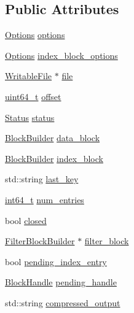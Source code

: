 \subsection*{Public Attributes}
\begin{DoxyCompactItemize}
\item 
\hyperlink{structleveldb_1_1_options}{Options} \hyperlink{structleveldb_1_1_table_builder_1_1_rep_a0ca1914136ea4c451b026b4f1913fe36}{options}
\item 
\hyperlink{structleveldb_1_1_options}{Options} \hyperlink{structleveldb_1_1_table_builder_1_1_rep_a3ae22fe880ca1b98c3a7e24c1ec72c98}{index\+\_\+block\+\_\+options}
\item 
\hyperlink{classleveldb_1_1_writable_file}{Writable\+File} $\ast$ \hyperlink{structleveldb_1_1_table_builder_1_1_rep_a3c33014db181b382785784cf0864f92b}{file}
\item 
\hyperlink{stdint_8h_aaa5d1cd013383c889537491c3cfd9aad}{uint64\+\_\+t} \hyperlink{structleveldb_1_1_table_builder_1_1_rep_a308abc45d45b23d05a0764f6fc501c40}{offset}
\item 
\hyperlink{classleveldb_1_1_status}{Status} \hyperlink{structleveldb_1_1_table_builder_1_1_rep_a8345f0a97587121457fb180a1fb081dd}{status}
\item 
\hyperlink{classleveldb_1_1_block_builder}{Block\+Builder} \hyperlink{structleveldb_1_1_table_builder_1_1_rep_a6bef8b1271d88ec2d38aa7a0f9ae8a24}{data\+\_\+block}
\item 
\hyperlink{classleveldb_1_1_block_builder}{Block\+Builder} \hyperlink{structleveldb_1_1_table_builder_1_1_rep_a7d5740122ca84239cb009d513cf14681}{index\+\_\+block}
\item 
std\+::string \hyperlink{structleveldb_1_1_table_builder_1_1_rep_a5a071831c7e42011a40b04cb60cdfa09}{last\+\_\+key}
\item 
\hyperlink{stdint_8h_adec1df1b8b51cb32b77e5b86fff46471}{int64\+\_\+t} \hyperlink{structleveldb_1_1_table_builder_1_1_rep_a89f93baffb3ca5c8239796dc1a57777a}{num\+\_\+entries}
\item 
bool \hyperlink{structleveldb_1_1_table_builder_1_1_rep_a5324550d58b999bcea173b1c21060138}{closed}
\item 
\hyperlink{classleveldb_1_1_filter_block_builder}{Filter\+Block\+Builder} $\ast$ \hyperlink{structleveldb_1_1_table_builder_1_1_rep_aad1620ca746b7287a819880be083ec6b}{filter\+\_\+block}
\item 
bool \hyperlink{structleveldb_1_1_table_builder_1_1_rep_a56e14221a2e29941a37d208f99770c20}{pending\+\_\+index\+\_\+entry}
\item 
\hyperlink{classleveldb_1_1_block_handle}{Block\+Handle} \hyperlink{structleveldb_1_1_table_builder_1_1_rep_abf3b47f6f2b7407399c7134ac65f7225}{pending\+\_\+handle}
\item 
std\+::string \hyperlink{structleveldb_1_1_table_builder_1_1_rep_ae299e513afc71a8474c303b25aaadb08}{compressed\+\_\+output}
\end{DoxyCompactItemize}


